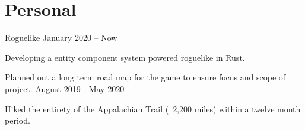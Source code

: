 \documentclass{marvinkassabian_resume}
\begin{document}
	\section{Personal}
		\subsectiondate
				{Roguelike}
				{January 2020 – Now}
			\resumesublistbegin
				\item Developing a entity component system powered roguelike in Rust.
				\item Planned out a long term road map for the game to ensure focus and scope of project.
			\resumesublistend
				{August 2019 - May 2020}
			\resumesublistbegin
				\item Hiked the entirety of the Appalachian Trail (~2,200 miles) within a twelve month period.
			\resumesublistend
\end{document}
